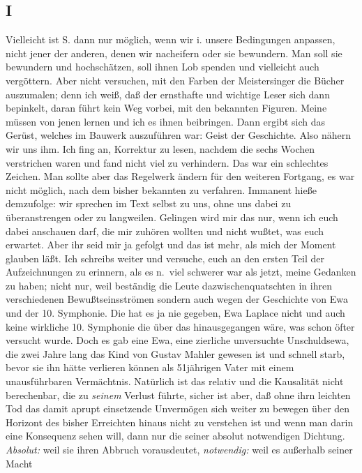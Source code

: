 \documentclass[
]{article}
\author{}
\date{\vspace{-2.5em}}
\begin{document}
\subsection{I}\label{i}

Vielleicht ist S. dann nur möglich, wenn wir i. unsere Bedingungen
anpassen, nicht jener der anderen, denen wir nacheifern oder sie
bewundern. Man soll sie bewundern und hochschätzen, soll ihnen Lob
spenden und vielleicht auch vergöttern. Aber nicht versuchen, mit den
Farben der Meistersinger die Bücher auszumalen; denn ich weiß, daß der
ernsthafte und wichtige Leser sich dann bepinkelt, daran führt kein Weg
vorbei, mit den bekannten Figuren. Meine müssen von jenen lernen und ich
es ihnen beibringen. Dann ergibt sich das Gerüst, welches im Bauwerk
auszuführen war: Geist der Geschichte. Also nähern wir uns ihm. Ich fing
an, Korrektur zu lesen, nachdem die sechs Wochen verstrichen waren und
fand nicht viel zu verhindern. Das war ein schlechtes Zeichen. Man
sollte aber das Regelwerk ändern für den weiteren Fortgang, es war nicht
möglich, nach dem bisher bekannten zu verfahren. Immanent hieße
demzufolge: wir sprechen im Text selbst zu uns, ohne uns dabei zu
überanstrengen oder zu langweilen. Gelingen wird mir das nur, wenn ich
euch dabei anschauen darf, die mir zuhören wollten und nicht wußtet, was
euch erwartet. Aber ihr seid mir ja gefolgt und das ist mehr, als mich
der Moment glauben läßt. Ich schreibs weiter und versuche, euch an den
ersten Teil der Aufzeichnungen zu erinnern, als es n.~viel schwerer war
als jetzt, meine Gedanken zu haben; nicht nur, weil beständig die Leute
dazwischenquatschten in ihren verschiedenen Bewußtseinsströmen sondern
auch wegen der Geschichte von Ewa und der 10. Symphonie. Die hat es ja
nie gegeben, Ewa Laplace nicht und auch keine wirkliche 10. Symphonie
die über das hinausgegangen wäre, was schon öfter versucht wurde. Doch
es gab eine Ewa, eine zierliche unversuchte Unschuldsewa, die zwei Jahre
lang das Kind von Gustav Mahler gewesen ist und schnell starb, bevor sie
ihn hätte verlieren können als 51jährigen Vater mit einem unausführbaren
Vermächtnis. Natürlich ist das relativ und die Kausalität nicht
berechenbar, die zu \emph{seinem} Verlust führte, sicher ist aber, daß
ohne ihrn leichten Tod das damit aprupt einsetzende Unvermögen sich
weiter zu bewegen über den Horizont des bisher Erreichten hinaus nicht
zu verstehen ist und wenn man darin eine Konsequenz sehen will, dann nur
die seiner absolut notwendigen Dichtung. \emph{Absolut:} weil sie ihren
Abbruch vorausdeutet, \emph{notwendig:} weil es außerhalb seiner Macht
\end{document}

